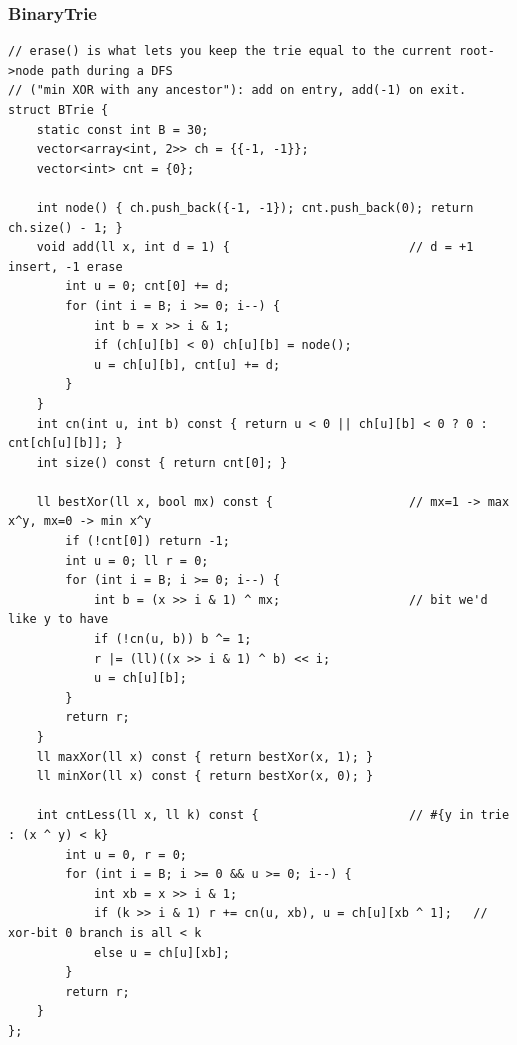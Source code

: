 \documentclass[9pt,a4paper,twocolumn]{extarticle}
\begin{document}
\subsubsection{BinaryTrie}
\nopagebreak{\footnotesize\sffamily\color{blurb} Binary trie over [0, 2\textasciicircum{}(B+1)). insert / ERASE / query all O(B).\par}\nopagebreak
\begin{lstlisting}
// erase() is what lets you keep the trie equal to the current root->node path during a DFS
// ("min XOR with any ancestor"): add on entry, add(-1) on exit.
struct BTrie {
    static const int B = 30;
    vector<array<int, 2>> ch = {{-1, -1}};
    vector<int> cnt = {0};

    int node() { ch.push_back({-1, -1}); cnt.push_back(0); return ch.size() - 1; }
    void add(ll x, int d = 1) {                         // d = +1 insert, -1 erase
        int u = 0; cnt[0] += d;
        for (int i = B; i >= 0; i--) {
            int b = x >> i & 1;
            if (ch[u][b] < 0) ch[u][b] = node();
            u = ch[u][b], cnt[u] += d;
        }
    }
    int cn(int u, int b) const { return u < 0 || ch[u][b] < 0 ? 0 : cnt[ch[u][b]]; }
    int size() const { return cnt[0]; }

    ll bestXor(ll x, bool mx) const {                   // mx=1 -> max x^y, mx=0 -> min x^y
        if (!cnt[0]) return -1;
        int u = 0; ll r = 0;
        for (int i = B; i >= 0; i--) {
            int b = (x >> i & 1) ^ mx;                  // bit we'd like y to have
            if (!cn(u, b)) b ^= 1;
            r |= (ll)((x >> i & 1) ^ b) << i;
            u = ch[u][b];
        }
        return r;
    }
    ll maxXor(ll x) const { return bestXor(x, 1); }
    ll minXor(ll x) const { return bestXor(x, 0); }

    int cntLess(ll x, ll k) const {                     // #{y in trie : (x ^ y) < k}
        int u = 0, r = 0;
        for (int i = B; i >= 0 && u >= 0; i--) {
            int xb = x >> i & 1;
            if (k >> i & 1) r += cn(u, xb), u = ch[u][xb ^ 1];   // xor-bit 0 branch is all < k
            else u = ch[u][xb];
        }
        return r;
    }
};
\end{lstlisting}

\filbreak
\end{document}
